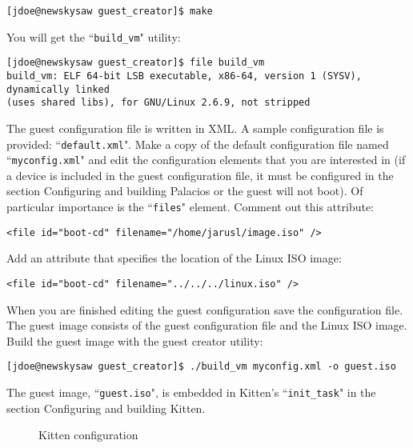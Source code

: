 \documentclass{article}[11pt]
\def\colfigsize{\epsfxsize=5in}
\begin{document}
\begin{verbatim}
[jdoe@newskysaw guest_creator]$ make
\end{verbatim}

\noindent
You will get the ``\verb|build_vm|" utility:
\begin{verbatim}
[jdoe@newskysaw guest_creator]$ file build_vm
build_vm: ELF 64-bit LSB executable, x86-64, version 1 (SYSV), dynamically linked
(uses shared libs), for GNU/Linux 2.6.9, not stripped
\end{verbatim}

\noindent
The guest configuration file is written in XML. A sample configuration file is
provided: ``\verb|default.xml|". Make a copy of the default configuration file
named ``\verb|myconfig.xml|" and edit the configuration elements that you are
interested in (if a device is included in the guest configuration file, it
must be configured in the section Configuring and building Palacios or the guest
will not boot). Of particular importance is the ``\verb|files|" element. Comment
out this attribute:

\begin{verbatim}
<file id="boot-cd" filename="/home/jarusl/image.iso" />
\end{verbatim}

\noindent
Add an attribute that specifies the location of the Linux ISO image:

\begin{verbatim}
<file id="boot-cd" filename="../../../linux.iso" />
\end{verbatim}

\noindent
When you are finished editing the guest configuration save the configuration
file. The guest image consists of the guest configuration file and the Linux
ISO image. Build the guest image with the guest creator utility:

\begin{verbatim}
[jdoe@newskysaw guest_creator]$ ./build_vm myconfig.xml -o guest.iso
\end{verbatim}

\noindent
The guest image, ``\verb+guest.iso+", is embedded in Kitten's
``\verb|init_task|" in the section Configuring and building Kitten.


\pagebreak
\begin{figure}[h]
  \begin{center}
    \colfigsize{}
  \end{center}
  \caption{Kitten configuration}
  \label{fig:kittencf}
\end{figure}
\end{document}
